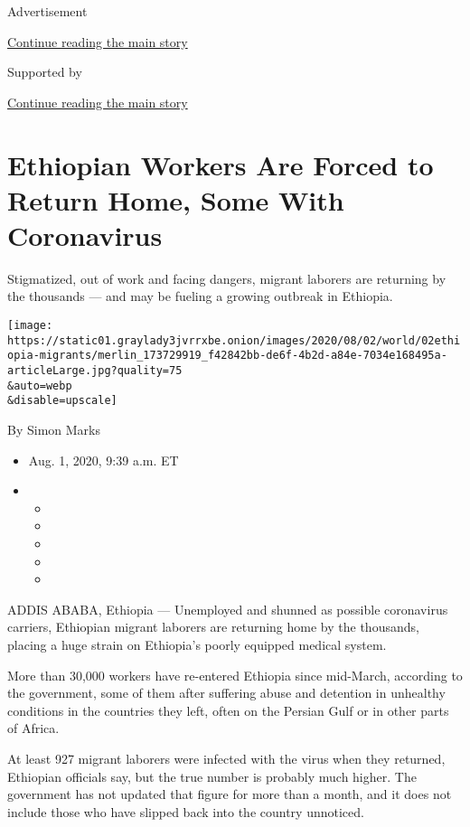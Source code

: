 Advertisement

\protect\hyperlink{after-top}{Continue reading the main story}

Supported by

\protect\hyperlink{after-sponsor}{Continue reading the main story}

\hypertarget{ethiopian-workers-are-forced-to-return-home-some-with-coronavirus}{%
\section{Ethiopian Workers Are Forced to Return Home, Some With
Coronavirus}\label{ethiopian-workers-are-forced-to-return-home-some-with-coronavirus}}

Stigmatized, out of work and facing dangers, migrant laborers are
returning by the thousands --- and may be fueling a growing outbreak in
Ethiopia.

\texttt{[image: https://static01.graylady3jvrrxbe.onion/images/2020/08/02/world/02ethiopia-migrants/merlin\_173729919\_f42842bb-de6f-4b2d-a84e-7034e168495a-articleLarge.jpg?quality=75\\\&auto=webp\\\&disable=upscale]}

By Simon Marks

\begin{itemize}
\item
  Aug. 1, 2020, 9:39 a.m. ET
\item
  \begin{itemize}
  \item
  \item
  \item
  \item
  \item
  \end{itemize}
\end{itemize}

ADDIS ABABA, Ethiopia --- Unemployed and shunned as possible coronavirus
carriers, Ethiopian migrant laborers are returning home by the
thousands, placing a huge strain on Ethiopia's poorly equipped medical
system.

More than 30,000 workers have re-entered Ethiopia since mid-March,
according to the government, some of them after suffering abuse and
detention in unhealthy conditions in the countries they left, often on
the Persian Gulf or in other parts of Africa.

At least 927 migrant laborers were infected with the virus when they
returned, Ethiopian officials say, but the true number is probably much
higher. The government has not updated that figure for more than a
month, and it does not include those who have slipped back into the
country unnoticed.

